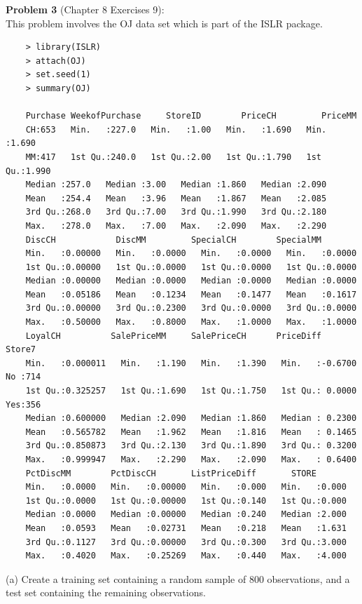 \documentclass{article}
\begin{document}
{\bf Problem 3} (Chapter 8 Exercises 9):\\
This problem involves the OJ data set which is part of the ISLR package.\\
\begin{program}
	\begin{verbatim}
	> library(ISLR)
	> attach(OJ)
	> set.seed(1)
	> summary(OJ)
	
	Purchase WeekofPurchase     StoreID        PriceCH         PriceMM     
	CH:653   Min.   :227.0   Min.   :1.00   Min.   :1.690   Min.   :1.690  
	MM:417   1st Qu.:240.0   1st Qu.:2.00   1st Qu.:1.790   1st Qu.:1.990  
	Median :257.0   Median :3.00   Median :1.860   Median :2.090  
	Mean   :254.4   Mean   :3.96   Mean   :1.867   Mean   :2.085  
	3rd Qu.:268.0   3rd Qu.:7.00   3rd Qu.:1.990   3rd Qu.:2.180  
	Max.   :278.0   Max.   :7.00   Max.   :2.090   Max.   :2.290  
	DiscCH            DiscMM         SpecialCH        SpecialMM     
	Min.   :0.00000   Min.   :0.0000   Min.   :0.0000   Min.   :0.0000  
	1st Qu.:0.00000   1st Qu.:0.0000   1st Qu.:0.0000   1st Qu.:0.0000  
	Median :0.00000   Median :0.0000   Median :0.0000   Median :0.0000  
	Mean   :0.05186   Mean   :0.1234   Mean   :0.1477   Mean   :0.1617  
	3rd Qu.:0.00000   3rd Qu.:0.2300   3rd Qu.:0.0000   3rd Qu.:0.0000  
	Max.   :0.50000   Max.   :0.8000   Max.   :1.0000   Max.   :1.0000  
	LoyalCH          SalePriceMM     SalePriceCH      PriceDiff       Store7   
	Min.   :0.000011   Min.   :1.190   Min.   :1.390   Min.   :-0.6700   No :714  
	1st Qu.:0.325257   1st Qu.:1.690   1st Qu.:1.750   1st Qu.: 0.0000   Yes:356  
	Median :0.600000   Median :2.090   Median :1.860   Median : 0.2300            
	Mean   :0.565782   Mean   :1.962   Mean   :1.816   Mean   : 0.1465            
	3rd Qu.:0.850873   3rd Qu.:2.130   3rd Qu.:1.890   3rd Qu.: 0.3200            
	Max.   :0.999947   Max.   :2.290   Max.   :2.090   Max.   : 0.6400            
	PctDiscMM        PctDiscCH       ListPriceDiff       STORE      
	Min.   :0.0000   Min.   :0.00000   Min.   :0.000   Min.   :0.000  
	1st Qu.:0.0000   1st Qu.:0.00000   1st Qu.:0.140   1st Qu.:0.000  
	Median :0.0000   Median :0.00000   Median :0.240   Median :2.000  
	Mean   :0.0593   Mean   :0.02731   Mean   :0.218   Mean   :1.631  
	3rd Qu.:0.1127   3rd Qu.:0.00000   3rd Qu.:0.300   3rd Qu.:3.000  
	Max.   :0.4020   Max.   :0.25269   Max.   :0.440   Max.   :4.000  
	\end{verbatim}
\end{program}


(a) Create a training set containing a random sample of 800 observations, and a test set containing the remaining observations.\\
\end{document}
